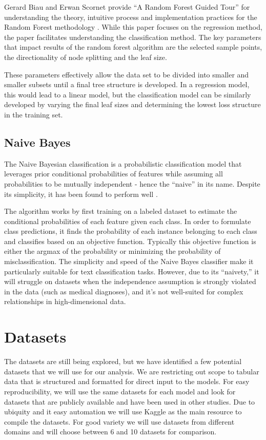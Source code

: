 \documentclass[10pt,twocolumn,letterpaper]{article}
\begin{document}
Gerard Biau and Erwan Scornet provide “A Random Forest Guided Tour” for understanding the theory, intuitive process and implementation practices for the Random Forest methodology \cite{randomforesttour}.
While this paper focuses on the regression method, the paper facilitates understanding the classification method.
The key parameters that impact results of the random forest algorithm are the selected sample points, the directionality of node splitting and the leaf size.

These parameters effectively allow the data set to be divided into smaller and smaller subsets until a final tree structure is developed.
In a regression model, this would lead to a linear model, but the classification model can be similarly developed by varying the final leaf sizes and determining the lowest loss structure in the training set.

\subsection{Naive Bayes}

The Naive Bayesian classification is a probabilistic classification model that leverages prior conditional probabilities of features while assuming all probabilities to be mutually independent - hence the “naive” in its name.
Despite its simplicity, it has been found to perform well \cite{domingos,webb}. 

The algorithm works by first training on a labeled dataset to estimate the conditional probabilities of each feature given each class.
In order to formulate class predictions, it finds the probability of each instance belonging to each class and classifies based on an objective function.
Typically this objective function is either the argmax of the probability or minimizing the probability of misclassification.
The simplicity and speed of the Naive Bayes classifier make it particularly suitable for text classification tasks.
However, due to its “naivety,” it will struggle on datasets when the independence assumption is strongly violated in the data (such as medical diagnoses), and it’s not well-suited for complex relationships in high-dimensional data.

\section{Datasets}

The datasets are still being explored, but we have identified a few potential datasets that we will use for our analysis.
We are restricting out scope to tabular data that is structured and formatted for direct input to the models.
For easy reproducibility, we will use the same datasets for each model and look for datasets that are publicly available and have been used in other studies.
Due to ubiquity and it easy automation we will use Kaggle as the main resource to compile the datasets.
For good variety we will use datasets from different domains and will choose between 6 and 10 datasets for comparison.
\end{document}
